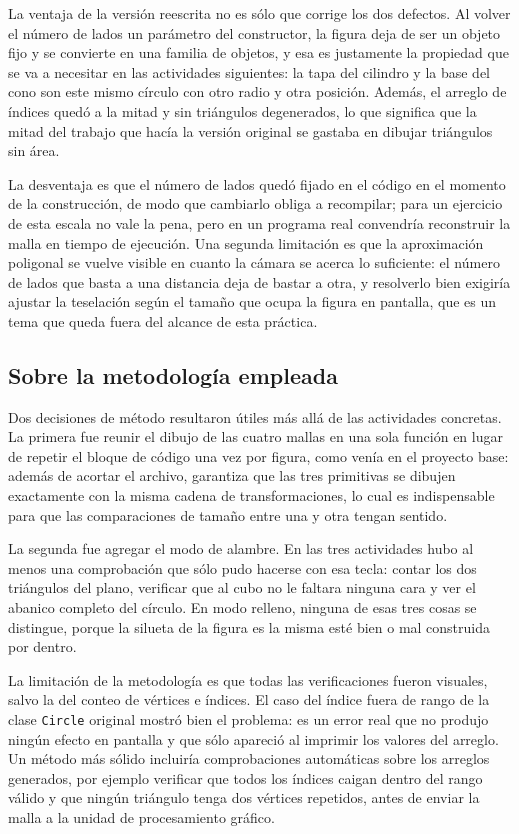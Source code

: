 La ventaja de la versión reescrita no es sólo que corrige los dos defectos. Al
volver el número de lados un parámetro del constructor, la figura deja de ser un
objeto fijo y se convierte en una familia de objetos, y esa es justamente la
propiedad que se va a necesitar en las actividades siguientes: la tapa del
cilindro y la base del cono son este mismo círculo con otro radio y otra
posición. Además, el arreglo de índices quedó a la mitad y sin triángulos
degenerados, lo que significa que la mitad del trabajo que hacía la versión
original se gastaba en dibujar triángulos sin área.

La desventaja es que el número de lados quedó fijado en el código en el momento
de la construcción, de modo que cambiarlo obliga a recompilar; para un ejercicio
de esta escala no vale la pena, pero en un programa real convendría reconstruir
la malla en tiempo de ejecución. Una segunda limitación es que la aproximación
poligonal se vuelve visible en cuanto la cámara se acerca lo suficiente: el
número de lados que basta a una distancia deja de bastar a otra, y resolverlo
bien exigiría ajustar la teselación según el tamaño que ocupa la figura en
pantalla, que es un tema que queda fuera del alcance de esta práctica.

\subsection{Sobre la metodología empleada}
Dos decisiones de método resultaron útiles más allá de las actividades
concretas. La primera fue reunir el dibujo de las cuatro mallas en una sola
función en lugar de repetir el bloque de código una vez por figura, como venía
en el proyecto base: además de acortar el archivo, garantiza que las tres
primitivas se dibujen exactamente con la misma cadena de transformaciones, lo
cual es indispensable para que las comparaciones de tamaño entre una y otra
tengan sentido.

La segunda fue agregar el modo de alambre. En las tres actividades hubo al menos
una comprobación que sólo pudo hacerse con esa tecla: contar los dos triángulos
del plano, verificar que al cubo no le faltara ninguna cara y ver el abanico
completo del círculo. En modo relleno, ninguna de esas tres cosas se distingue,
porque la silueta de la figura es la misma esté bien o mal construida por
dentro.

La limitación de la metodología es que todas las verificaciones fueron visuales,
salvo la del conteo de vértices e índices. El caso del índice fuera de rango de
la clase \texttt{Circle} original mostró bien el problema: es un error real que
no produjo ningún efecto en pantalla y que sólo apareció al imprimir los valores
del arreglo. Un método más sólido incluiría comprobaciones automáticas sobre los
arreglos generados, por ejemplo verificar que todos los índices caigan dentro
del rango válido y que ningún triángulo tenga dos vértices repetidos, antes de
enviar la malla a la unidad de procesamiento gráfico.

